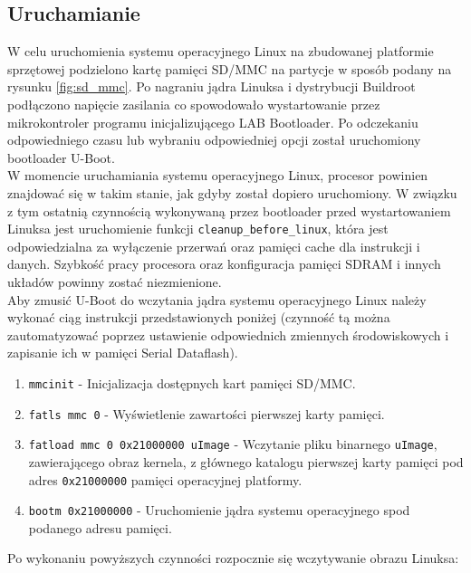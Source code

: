 \documentclass[a4paper,12pt]{book}
\begin{document}
			\subsection{Uruchamianie}
				W celu uruchomienia systemu operacyjnego Linux na zbudowanej platformie sprzętowej podzielono kartę pamięci SD/MMC na partycje w sposób podany na rysunku \ref{fig:sd_mmc}. Po nagraniu jądra Linuksa i dystrybucji Buildroot podłączono napięcie zasilania co spowodowało wystartowanie przez mikrokontroler programu inicjalizującego LAB Bootloader. Po odczekaniu odpowiedniego czasu lub wybraniu odpowiedniej opcji został uruchomiony bootloader U-Boot.\\
				W momencie uruchamiania systemu operacyjnego Linux, procesor powinien znajdować się w takim stanie, jak gdyby został dopiero uruchomiony. W związku z tym ostatnią czynnością wykonywaną przez bootloader przed wystartowaniem Linuksa jest uruchomienie funkcji \texttt{cleanup\_before\_linux}, która jest odpowiedzialna za wyłączenie przerwań oraz pamięci cache dla instrukcji i danych. Szybkość pracy procesora oraz konfiguracja pamięci SDRAM i innych układów powinny zostać niezmienione.\\
				Aby zmusić U-Boot do wczytania jądra systemu operacyjnego Linux należy wykonać ciąg instrukcji przedstawionych poniżej (czynność tą można zautomatyzować poprzez ustawienie odpowiednich zmiennych środowiskowych i zapisanie ich w pamięci Serial Dataflash).
				\begin{enumerate}
					\item \texttt{mmcinit} - Inicjalizacja dostępnych kart pamięci SD/MMC.
					\item \texttt{fatls mmc 0} - Wyświetlenie zawartości pierwszej karty pamięci.
					\item \texttt{fatload mmc 0 0x21000000 uImage} - Wczytanie pliku binarnego \texttt{uImage}, zawierającego obraz kernela, z głównego katalogu pierwszej karty pamięci pod adres \texttt{0x21000000} pamięci operacyjnej platformy.
					\item \texttt{bootm 0x21000000} - Uruchomienie jądra systemu operacyjnego spod podanego adresu pamięci.
				\end{enumerate}
				Po wykonaniu powyższych czynności rozpocznie się wczytywanie obrazu Linuksa:
\end{document}
